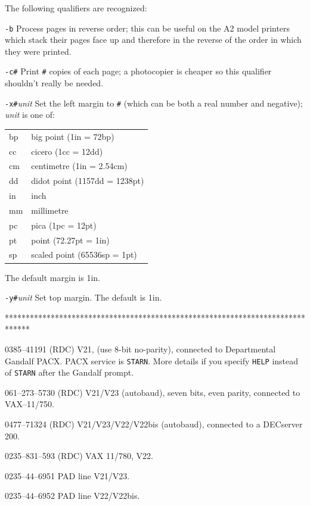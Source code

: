 \documentclass[twoside,11pt]{starlink}
\begin{document}
\newpage

\small
\begin{terminalv}
The following qualifiers are recognized:

\begin{list}{}{
  \setlength{\leftmargin}{\labelwidth}
  \addtolength{\labelwidth}{\labelsep}}
  \item[\texttt{-b}] Process pages in reverse order; this can be useful on the
  A2 model printers which stack their pages face up and therefore in the
  reverse of the order in which they were printed.
  \item[\texttt{-c\#}]  Print \texttt{\#} copies of each page; a photocopier is
  cheaper so this qualifier shouldn't really be needed.
  \item[\texttt{-x\#}\textit{unit}] Set the left margin to \texttt{\#} (which
  can be both a real number and negative); \textit{unit} is one of:

  \begin{tabular}{ll}
    bp &big point (1in = 72bp)\\
    cc &cicero (1cc = 12dd)\\
    cm &centimetre (1in = 2.54cm)\\
    dd &didot point (1157dd = 1238pt)\\
    in &inch\\
    mm &millimetre\\
    pc &pica (1pc = 12pt)\\
    pt &point (72.27pt = 1in)\\
    sp &scaled point (65536sp = 1pt)
  \end{tabular}

  The default margin is 1in.
  \item[\texttt{-y\#}\textit{unit}] Set top margin. The default is 1in.
\end{list}

******************************************************************************

\newlength{\numlen}
\settowidth{\numlen}{xxxx000--000--0000}
\settowidth{\labelsep}{000}

\begin{list}{}{\setlength{\labelwidth}{\numlen}\setlength{\leftmargin}{\numlen}
  \addtolength{\leftmargin}{\labelsep}}
  \item[0385--41191] (RDC) V21, (use 8-bit no-parity), connected to
  Departmental Gandalf PACX.
  PACX service is \texttt{STARN}.
  More details if you specify \texttt{HELP} instead of \texttt{STARN} after
  the Gandalf prompt.
  \item[061--273--5730] (RDC) V21/V23 (autobaud), seven bits, even parity,
  connected to VAX--11/750.
  \item[0477--71324] (RDC) V21/V23/V22/V22bis (autobaud), connected to a DECserver
  200.
  \item[0235--831--593] (RDC) VAX 11/780, V22.
  \item[0235--44--6951] PAD line V21/V23.
  \item[0235--44--6952] PAD line V22/V22bis.
\end{list}
\end{terminalv}
\normalsize
\end{document}
